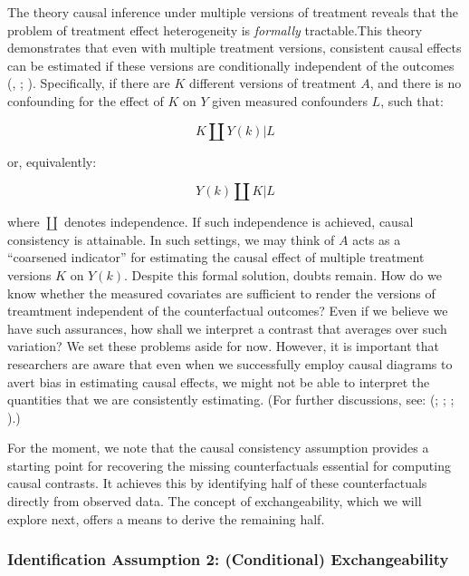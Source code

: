 \documentclass[
  singlecolumn,
  9pt]{article}
\begin{document}
The theory causal inference under multiple versions of treatment reveals
that the problem of treatment effect heterogeneity is \emph{formally}
tractable.This theory demonstrates that even with multiple treatment
versions, consistent causal effects can be estimated if these versions
are conditionally independent of the outcomes
(,
;
).
Specifically, if there are \(K\) different versions of treatment \(A\),
and there is no confounding for the effect of \(K\) on \(Y\) given
measured confounders \(L\), such that:

\[
K \coprod Y(k) | L
\]

or, equivalently:

\[
Y(k) \coprod K | L
\]

where \(\coprod\) denotes independence. If such independence is
achieved, causal consistency is attainable. In such settings, we may
think of \(A\) acts as a ``coarsened indicator'' for estimating the
causal effect of multiple treatment versions \(K\) on \(Y(k)\). Despite
this formal solution, doubts remain. How do we know whether the measured
covariates are sufficient to render the versions of treamtment
independent of the counterfactual outcomes? Even if we believe we have
such assurances, how shall we interpret a contrast that averages over
such variation? We set these problems aside for now. However, it is
important that researchers are aware that even when we successfully
employ causal diagrams to avert bias in estimating causal effects, we
might not be able to interpret the quantities that we are consistently
estimating. (For further discussions, see:
(;
;
;
).)

For the moment, we note that the causal consistency assumption provides
a starting point for recovering the missing counterfactuals essential
for computing causal contrasts. It achieves this by identifying half of
these counterfactuals directly from observed data. The concept of
exchangeability, which we will explore next, offers a means to derive
the remaining half.

\subsubsection{Identification Assumption 2: (Conditional)
Exchangeability}\label{identification-assumption-2-conditional-exchangeability}
\end{document}
